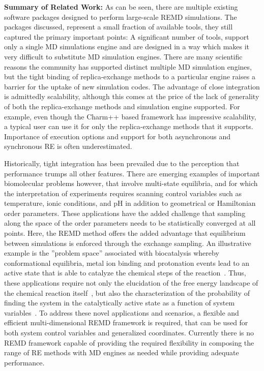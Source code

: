 \documentclass{sig-alternate-05-2015}
\begin{document}
{\bf Summary of Related Work:} As can be seen, there are multiple existing software packages designed to perform large-scale REMD simulations. The packages discussed, represent a small fraction of available tools, they still captured the primary important points: A significant number of tools, support only a single MD simulations engine and are designed in a way which makes it very difficult to substitute MD simulation engines. There are many scientific reasons the community has supported distinct multiple MD simulation engines, but the tight binding of replica-exchange methods to a particular engine raises a barrier for the uptake of new simulation codes. The advantage of close integration is admittedly scalability, although this comes at the price of the lack of generality of both the replica-exchange methods and simulation engine supported. For example, even though the Charm++ based framework has impressive scalability, a typical user can use it for only the replica-exchange methods that it supports. Importance of execution options and support for both asynchronous and synchronous RE is often underestimated.

Historically, tight integration has been prevailed due to the perception that performance trumps all other features. There are emerging examples of important biomolecular problems however, that involve multi-state equilibria, and for which the interpretation of experiments requires scanning control variables such as temperature, ionic conditions, and pH in addition to geometrical or Hamiltonian order parameters\cite{Bergonzo_JChemTheoryComput_2014_v10_p492}.
These applications have the added challenge that sampling along the space of the order parameters needs to be statistically converged at all points. Here, the REMD method offers the added advantage that equilibrium between simulations is enforced through the exchange sampling. An illustrative example is the ''problem space'' associated with biocatalysis whereby conformational equilibria, metal ion binding and protonation events lead to an active state that is able to catalyze the chemical steps of the reaction~\cite{Panteva_BookChap_MultiscaleRNAEnzym_2015_v553_p335}.  Thus, these applications require not only the elucidation of the free energy landscape of the chemical reaction itself~\cite{Ensing_AccChemRes_2006_v39_p73, Vanden-Eijnden_JComputChem_2009_v30_p1737},
but also the characterization of the probability of finding the system in the catalytically active state as a function of system variables~\cite{Dissanayake_Biochemistry_2015_v54_p1307}. To address these novel applications and scenarios, a flexible and efficient multi-dimensional REMD framework is required, that can be used for both system control variables and generalized coordinates. Currently there is no REMD framework capable of providing the required flexibility in composing the range of RE methods with MD engines as needed while providing adequate performance.
\end{document}
